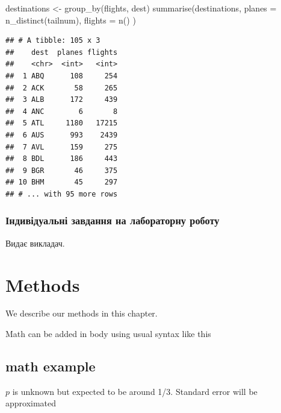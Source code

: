 \documentclass[
]{book}
\newenvironment{Shaded}{\begin{snugshade}}{\end{snugshade}}
\newcommand{\AttributeTok}[1]{\textcolor[rgb]{0.77,0.63,0.00}{#1}}
\newcommand{\FunctionTok}[1]{\textcolor[rgb]{0.00,0.00,0.00}{#1}}
\newcommand{\NormalTok}[1]{#1}
\newcommand{\OtherTok}[1]{\textcolor[rgb]{0.56,0.35,0.01}{#1}}
\begin{document}
\begin{Shaded}
\begin{Highlighting}[]
\NormalTok{destinations }\OtherTok{\textless{}{-}} \FunctionTok{group\_by}\NormalTok{(flights, dest)}
\FunctionTok{summarise}\NormalTok{(destinations,}
  \AttributeTok{planes =} \FunctionTok{n\_distinct}\NormalTok{(tailnum),}
  \AttributeTok{flights =} \FunctionTok{n}\NormalTok{()}
\NormalTok{)}
\end{Highlighting}
\end{Shaded}

\begin{verbatim}
## # A tibble: 105 x 3
##    dest  planes flights
##    <chr>  <int>   <int>
##  1 ABQ      108     254
##  2 ACK       58     265
##  3 ALB      172     439
##  4 ANC        6       8
##  5 ATL     1180   17215
##  6 AUS      993    2439
##  7 AVL      159     275
##  8 BDL      186     443
##  9 BGR       46     375
## 10 BHM       45     297
## # ... with 95 more rows
\end{verbatim}

\hypertarget{ux456ux43dux434ux438ux432ux456ux434ux443ux430ux43bux44cux43dux456-ux437ux430ux432ux434ux430ux43dux43dux44f-ux43dux430-ux43bux430ux431ux43eux440ux430ux442ux43eux440ux43dux443-ux440ux43eux431ux43eux442ux443-1}{%
\subsection{Індивідуальні завдання на лабораторну роботу}\label{ux456ux43dux434ux438ux432ux456ux434ux443ux430ux43bux44cux43dux456-ux437ux430ux432ux434ux430ux43dux43dux44f-ux43dux430-ux43bux430ux431ux43eux440ux430ux442ux43eux440ux43dux443-ux440ux43eux431ux43eux442ux443-1}}

Видає викладач.

\hypertarget{methods}{%
\chapter{Methods}\label{methods}}

We describe our methods in this chapter.

Math can be added in body using usual syntax like this

\hypertarget{math-example}{%
\section{math example}\label{math-example}}

\(p\) is unknown but expected to be around 1/3. Standard error will be approximated
\end{document}
